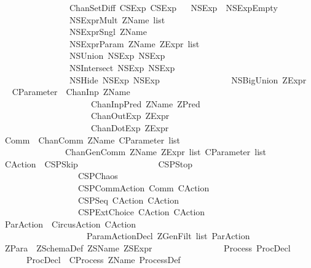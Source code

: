 \begin{isabellebody}
\ \ \ \ \ \ \ \ \ \ \ \ \ \ \ {\isacharbar}\ ChanSetDiff\ CSExp\ CSExp\isanewline
\ \isanewline
{}\isamarkupfalse%
\ NSExp\ {\isacharequal}\ NSExpEmpty\isanewline
\ \ \ \ \ \ \ \ \ \ \ \ \ \ \ {\isacharbar}\ NSExprMult\ {\isachardoublequoteopen}ZName\ list{\isachardoublequoteclose}\isanewline
\ \ \ \ \ \ \ \ \ \ \ \ \ \ \ {\isacharbar}\ NSExprSngl\ ZName\isanewline
\ \ \ \ \ \ \ \ \ \ \ \ \ \ \ {\isacharbar}\ NSExprParam\ ZName\ {\isachardoublequoteopen}ZExpr\ list{\isachardoublequoteclose}\isanewline
\ \ \ \ \ \ \ \ \ \ \ \ \ \ \ {\isacharbar}\ NSUnion\ NSExp\ NSExp\isanewline
\ \ \ \ \ \ \ \ \ \ \ \ \ \ \ {\isacharbar}\ NSIntersect\ NSExp\ NSExp\isanewline
\ \ \ \ \ \ \ \ \ \ \ \ \ \ \ {\isacharbar}\ NSHide\ NSExp\ NSExp\isanewline
\ \ \ \ \ \ \ \ \ \ \ \ \ \ \ {\isacharbar}\ NSBigUnion\ ZExpr\isanewline
\ \isanewline
{}\isamarkupfalse%
\ CParameter\ {\isacharequal}\ ChanInp\ ZName\isanewline
\ \ \ \ \ \ \ \ \ \ \ \ \ \ \ \ \ \ \ \ {\isacharbar}\ ChanInpPred\ ZName\ ZPred\isanewline
\ \ \ \ \ \ \ \ \ \ \ \ \ \ \ \ \ \ \ \ {\isacharbar}\ ChanOutExp\ ZExpr\isanewline
\ \ \ \ \ \ \ \ \ \ \ \ \ \ \ \ \ \ \ \ {\isacharbar}\ ChanDotExp\ ZExpr\isanewline
\ \isanewline
{}\isamarkupfalse%
\ Comm\ {\isacharequal}\ ChanComm\ ZName\ {\isachardoublequoteopen}CParameter\ list{\isachardoublequoteclose}\isanewline
\ \ \ \ \ \ \ \ \ \ \ \ \ \ {\isacharbar}\ ChanGenComm\ ZName\ {\isachardoublequoteopen}ZExpr\ list{\isachardoublequoteclose}\ {\isachardoublequoteopen}CParameter\ list{\isachardoublequoteclose}\isanewline
\ \isanewline
{}\isamarkupfalse%
\ CAction\ {\isacharequal}\ CSPSkip\isanewline
\ \ \ \ \ \ \ \ \ \ \ \ \ \ \ \ \ {\isacharbar}\ CSPStop\isanewline
\ \ \ \ \ \ \ \ \ \ \ \ \ \ \ \ \ {\isacharbar}\ CSPChaos\isanewline
\ \ \ \ \ \ \ \ \ \ \ \ \ \ \ \ \ {\isacharbar}\ CSPCommAction\ Comm\ CAction\isanewline
\ \ \ \ \ \ \ \ \ \ \ \ \ \ \ \ \ {\isacharbar}\ CSPSeq\ CAction\ CAction\isanewline
\ \ \ \ \ \ \ \ \ \ \ \ \ \ \ \ \ {\isacharbar}\ CSPExtChoice\ CAction\ CAction\isanewline
\ \isanewline
{}\isamarkupfalse%
\ ParAction\ {\isacharequal}\ CircusAction\ CAction\isanewline
\ \ \ \ \ \ \ \ \ \ \ \ \ \ \ \ \ \ \ {\isacharbar}\ ParamActionDecl\ {\isachardoublequoteopen}ZGenFilt\ list{\isachardoublequoteclose}\ ParAction\isanewline
\ \isanewline
{}\isamarkupfalse%
\ ZPara\ {\isacharequal}\ ZSchemaDef\ ZSName\ ZSExpr\isanewline
\ \ \ \ \ \ \ \ \ \ \ \ \ \ \ {\isacharbar}\ Process\ ProcDecl\isanewline
{}\ \ \ \ \ \ ProcDecl\ {\isacharequal}\ CProcess\ ZName\ ProcessDef\isanewline

\end{isabellebody}
